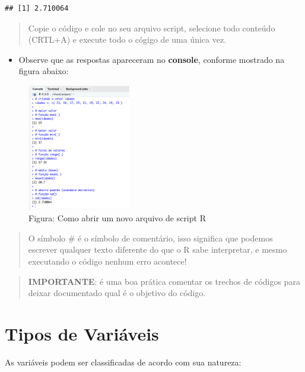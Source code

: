 \documentclass[
]{book}
\providecommand{\tightlist}{%
  \setlength{\itemsep}{0pt}\setlength{\parskip}{0pt}}
\begin{document}
\begin{verbatim}
## [1] 2.710064
\end{verbatim}

\begin{quote}
Copie o código e cole no seu arquivo script, selecione todo conteúdo (CRTL+A) e execute todo o cógigo de uma única vez.
\end{quote}

\begin{itemize}
\tightlist
\item
  Observe que as respostas apareceram no \textbf{console}, conforme mostrado na figura abaixo:
\end{itemize}

\begin{figure}
\centering
\includegraphics[width=0.4\textwidth,height=\textheight]{telaRespostaConsole.png}
\caption{Figura: Como abrir um novo arquivo de script R}
\end{figure}

\begin{quote}
O símbolo \# é o símbolo de comentário, isso significa que podemos escrever qualquer texto diferente do que o R sabe interpretar, e mesmo executando o código nenhum erro acontece!
\end{quote}

\begin{quote}
\textbf{IMPORTANTE}: é uma boa prática comentar os trechos de códigos para deixar documentado qual é o objetivo do código.
\end{quote}

\chapter{Tipos de Variáveis}\label{tipos-de-variuxe1veis}

As variáveis podem ser classificadas de acordo com sua natureza:
\end{document}
